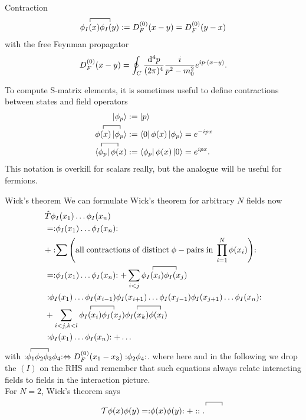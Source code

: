 \begin{mybox}{Contraction}
	\begin{equation}
		\contraction{}{\phi_I(x)}{}{\phi_I(y)} \phi_I(x) \phi_I(y) := D^{(0)}_F (x-y) = D^{(0)}_F(y-x)
	\end{equation}
	with the free Feynman propagator
	\begin{equation}
		D^{(0)}_F(x-y) =\oint_C \frac{\mathrm{d}^4p}{(2 \pi)^4} \frac{i}{p^2-m^2_0} e^{i p\cdot (x-y)}.
	\end{equation}
\end{mybox}
To compute S-matrix elements, it is sometimes useful to define contractions between states and
field operators
\begin{align}
 	\ket{\phi_p}&:=\ket{p}\\
 	\contraction{}{\phi(x)}{}{\ket{\phi_o}} \phi(x) \ket{\phi_p}&:=\bra{0}\phi(x) \ket{\phi_p}=e^{-ipx}\\
 	{	\contraction{}{\bra{\phi_p}}{}{\phi(x)}\bra{\phi_p}\phi(x)}&:=\bra{\phi_p}\phi(x)\ket{0}=e^{ipx}.
\end{align}
This notation is overkill for scalars really, but the analogue will be useful for fermions.
\begin{mybox}{Wick's theorem}
	We can formulate Wick's theorem for arbitrary $N$ fields now
	\begin{align*}
		&\hat{T}\phi_I(x_1) \dots \phi_I(x_n) \\
		&= \normord{\phi_I(x_1) \dots \phi_I(x_n)} \\
		&+ \normord{\sum \left(\mathrm{all \;contractions\; of \;distinct}\;\phi-\mathrm{pairs \; in} \; \prod_{i=1}^{N}\phi(x_i)\right)} \\
				&= \normord{\phi_I(x_1) \dots \phi_I(x_n)} + \sum_{i<j} \contraction{}{\phi_I(x_i)}{}{\phi_I(x_j)} \phi_I(x_i) \phi_I(x_j) \\
				&\normord{\phi_I(x_1) \dots \phi_I(x_{i-1})\phi_I(x_{i+1}) \dots  \phi_I(x_{j-1}) \phi_I(x_{j+1}) \dots \phi_I(x_n)} \\
				&+ \sum_{i<j, k<l} \contraction{}{\phi_I(x_i)}{}{\phi_I(x_j)} \phi_I(x_i) \phi_I(x_j) \contraction{}{\phi_I(x_k)}{}{\phi_I(x_l)} \phi_I(x_k) \phi(x_l) \\
				&\normord{\phi_I(x_1) \dots \phi_I(x_n)}+ \dots 
	\end{align*}
with $\normord{\contraction{}{\phi_1}{\phi_2}{\phi_3} \phi_1 \phi_2 \phi_3 \phi_4} \Leftrightarrow D^{(0)}_F(x_1-x_3) \normord{\phi_2 \phi_4}$. where here and in the following we drop the $(I)$ on the RHS and remember that such equations
always relate interacting fields to fields in the interaction picture.
\\
For $N=2$, Wick's theorem says
\begin{equation}
\mathcal{T} \phi(x) \phi(y) = \normord{\phi(x) \phi(y)} + \normord{\contraction{}{\phi(x)}{}{\phi(y)}{}}.
\end{equation}
\end{mybox}
